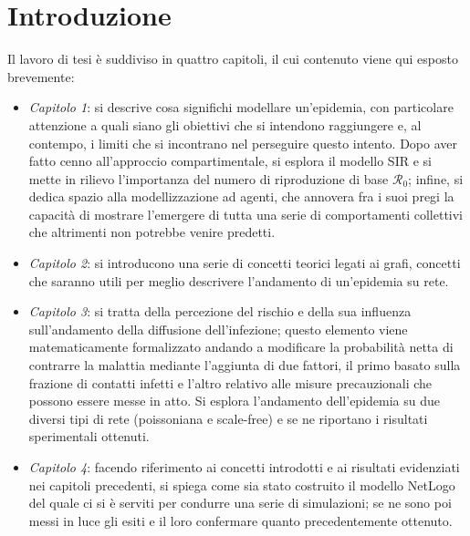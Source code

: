 \chapter*{Introduzione} 

\label{chap:intro}
Il lavoro di tesi è suddiviso in quattro capitoli, il cui contenuto viene qui esposto brevemente:
\begin{itemize}
\item \textit{Capitolo 1}: si descrive cosa significhi modellare un'epidemia, con particolare attenzione a quali siano gli obiettivi che si intendono raggiungere e, al contempo, i limiti che si incontrano nel perseguire questo intento. Dopo aver fatto cenno all'approccio compartimentale, si esplora il modello SIR e si mette in rilievo l'importanza del numero di riproduzione di base $\mathcal{R}_0$; infine, si dedica spazio alla modellizzazione ad agenti, che annovera fra i suoi pregi la capacità di mostrare l'emergere di tutta una serie di comportamenti collettivi che altrimenti non potrebbe venire predetti.
\item \textit{Capitolo 2}: si introducono una serie di concetti teorici legati ai grafi, concetti che saranno utili per meglio descrivere l'andamento di un'epidemia su rete.
\item \textit{Capitolo 3}: si tratta della percezione del rischio e della sua influenza sull'andamento della diffusione dell'infezione; questo elemento viene matematicamente formalizzato andando a modificare la probabilità netta di contrarre la malattia mediante l'aggiunta di due fattori, il primo basato sulla frazione di contatti infetti e l'altro relativo alle misure precauzionali che possono essere messe in atto. Si esplora l'andamento dell'epidemia su due diversi tipi di rete (poissoniana e scale-free) e se ne riportano i risultati sperimentali ottenuti.
\item \textit{Capitolo 4}: facendo riferimento ai concetti introdotti e ai risultati evidenziati nei capitoli precedenti, si spiega come sia stato costruito il modello NetLogo del quale ci si è serviti per condurre una serie di simulazioni; se ne sono poi messi in luce gli esiti e il loro confermare quanto precedentemente ottenuto.
\end{itemize}
